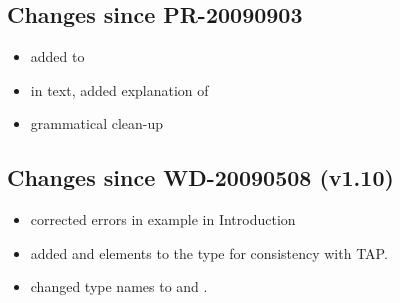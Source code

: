 \documentclass[11pt,a4paper]{ivoa}
\begin{document}
\subsection{Changes since PR-20090903}

\begin{itemize}
  \item added 
       to 
  \item in text, added explanation of
  \item grammatical clean-up
\end{itemize}

\subsection{Changes since WD-20090508 (v1.10)}

\begin{itemize}
  \item corrected errors in example in Introduction
  \item added  and
        elements to the
        type for consistency with TAP.
  \item changed type names  to
        and 
       .
\end{itemize}


\end{document}
